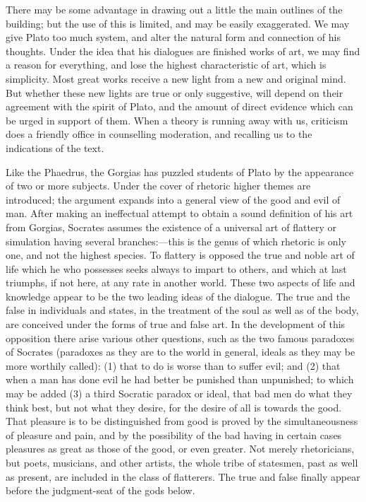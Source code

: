 \documentclass[11pt,letter]{article}
\begin{document}
\par  There may be some advantage in drawing out a little the main outlines of the building; but the use of this is limited, and may be easily exaggerated. We may give Plato too much system, and alter the natural form and connection of his thoughts. Under the idea that his dialogues are finished works of art, we may find a reason for everything, and lose the highest characteristic of art, which is simplicity. Most great works receive a new light from a new and original mind. But whether these new lights are true or only suggestive, will depend on their agreement with the spirit of Plato, and the amount of direct evidence which can be urged in support of them. When a theory is running away with us, criticism does a friendly office in counselling moderation, and recalling us to the indications of the text.

\par  Like the Phaedrus, the Gorgias has puzzled students of Plato by the appearance of two or more subjects. Under the cover of rhetoric higher themes are introduced; the argument expands into a general view of the good and evil of man. After making an ineffectual attempt to obtain a sound definition of his art from Gorgias, Socrates assumes the existence of a universal art of flattery or simulation having several branches:—this is the genus of which rhetoric is only one, and not the highest species. To flattery is opposed the true and noble art of life which he who possesses seeks always to impart to others, and which at last triumphs, if not here, at any rate in another world. These two aspects of life and knowledge appear to be the two leading ideas of the dialogue. The true and the false in individuals and states, in the treatment of the soul as well as of the body, are conceived under the forms of true and false art. In the development of this opposition there arise various other questions, such as the two famous paradoxes of Socrates (paradoxes as they are to the world in general, ideals as they may be more worthily called): (1) that to do is worse than to suffer evil; and (2) that when a man has done evil he had better be punished than unpunished; to which may be added (3) a third Socratic paradox or ideal, that bad men do what they think best, but not what they desire, for the desire of all is towards the good. That pleasure is to be distinguished from good is proved by the simultaneousness of pleasure and pain, and by the possibility of the bad having in certain cases pleasures as great as those of the good, or even greater. Not merely rhetoricians, but poets, musicians, and other artists, the whole tribe of statesmen, past as well as present, are included in the class of flatterers. The true and false finally appear before the judgment-seat of the gods below.
\end{document}
